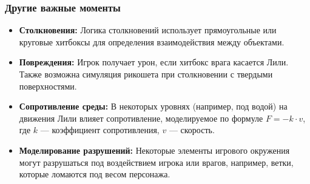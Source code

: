 \documentclass{article}
\begin{document}
\subsubsection{Другие важные моменты}
\begin{itemize}
    \item \textbf{Столкновения:} Логика столкновений использует прямоугольные или круговые хитбоксы для определения взаимодействия между объектами.
    \item \textbf{Повреждения:} Игрок получает урон, если хитбокс врага касается Лили. Также возможна симуляция рикошета при столкновении с твердыми поверхностями.
    \item \textbf{Сопротивление среды:} В некоторых уровнях (например, под водой) на движения Лили влияет сопротивление, моделируемое по формуле $F = -k \cdot v$, где $k$ — коэффициент сопротивления, $v$ — скорость.
    \item \textbf{Моделирование разрушений:} Некоторые элементы игрового окружения могут разрушаться под воздействием игрока или врагов, например, ветки, которые ломаются под весом персонажа.
\end{itemize}
\end{document}
